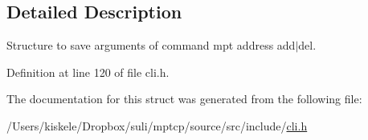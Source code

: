 \subsection{Detailed Description}
Structure to save arguments of command mpt address add$|$del. 

Definition at line 120 of file cli.\-h.



The documentation for this struct was generated from the following file\-:\begin{DoxyCompactItemize}
\item 
/\-Users/kiskele/\-Dropbox/suli/mptcp/source/src/include/\hyperlink{cli_8h}{cli.\-h}\end{DoxyCompactItemize}
